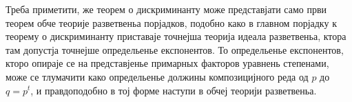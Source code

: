 \documentclass[11pt]{article}
\begin{document}
Треба приметити, же теорем о дискриминанту може представјати само први теорем обче теорије разветвеньа порјадков, подобно како в главном порјадку к теорему о дискриминанту приставаје точнејша теорија идеала разветвеньа, ктора там допустја точнејше определьенье експонентов. То определьенье експонентов, кторо опираје се на представјенье примарных факторов уравнень степенами, може се тлумачити како определьенье должины композицијного реда од $p$ до $q=p^t$, и правдоподобно в тој форме наступи в обчеј теорији разветвеньа.
\end{document}
